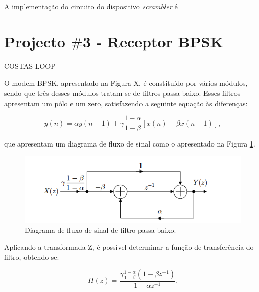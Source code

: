 \documentclass[11pt]{article}
\numberwithin{equation}{section}
\begin{document}
A implementação do circuito do dispositivo \textit{scrambler} é 


\section{Projecto $\#$3 - Receptor BPSK}


COSTAS LOOP



O modem BPSK, apresentado na Figura X, é constituído por vários módulos, sendo que três desses módulos tratam-se de filtros passa-baixo. Esses filtros apresentam um pólo e um zero, satisfazendo a seguinte equação às diferenças:

\vspace{-3mm}
\begin{equation}
y(n) = \alpha y(n-1) + \gamma \frac{1-\alpha}{1-\beta}[x(n)-\beta x(n-1)],
\end{equation} 

\vspace{1mm}
que apresentam um diagrama de fluxo de sinal como o apresentado na Figura \ref{fig:fluxo}.

\begin{figure}[H]
	\centering
	\includegraphics[keepaspectratio=true, scale=0.75]{exps/diagrama_fluxo}
	\caption{Diagrama de fluxo de sinal de filtro passa-baixo.}
	\label{fig:fluxo}
	\vspace{-0.8em}
\end{figure}

Aplicando a transformada Z, é possível determinar a função de transferência do filtro, obtendo-se:

\vspace{-3mm}
\begin{equation}
H(z) = \frac{\gamma \frac{1-\alpha}{1-\beta} (1-\beta z^{-1})}{1-\alpha z^{-1}}.
\end{equation}
 
\end{document}
